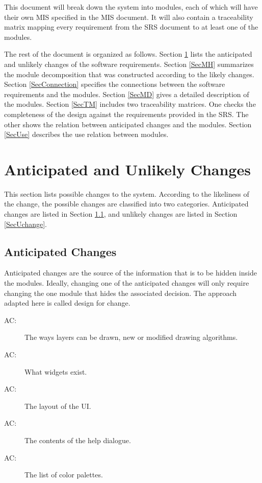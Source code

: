 \documentclass[12pt, titlepage]{article}
\newcounter{acnum}
\newcommand{\actheacnum}{AC\theacnum}
\begin{document}
This document will break down the system into modules, each of which will have their own MIS specified in the MIS document. It will also contain a traceability matrix mapping every requirement from the SRS document to at least one of the modules.

The rest of the document is organized as follows. Section
\ref{SecChange} lists the anticipated and unlikely changes of the software
requirements. Section \ref{SecMH} summarizes the module decomposition that
was constructed according to the likely changes. Section \ref{SecConnection}
specifies the connections between the software requirements and the
modules. Section \ref{SecMD} gives a detailed description of the
modules. Section \ref{SecTM} includes two traceability matrices. One checks
the completeness of the design against the requirements provided in the SRS. The
other shows the relation between anticipated changes and the modules. Section
\ref{SecUse} describes the use relation between modules.

\section{Anticipated and Unlikely Changes} \label{SecChange}

This section lists possible changes to the system. According to the likeliness
of the change, the possible changes are classified into two
categories. Anticipated changes are listed in Section \ref{SecAchange}, and
unlikely changes are listed in Section \ref{SecUchange}.

\subsection{Anticipated Changes} \label{SecAchange}

Anticipated changes are the source of the information that is to be hidden
inside the modules. Ideally, changing one of the anticipated changes will only
require changing the one module that hides the associated decision. The approach
adapted here is called design for
change.

\begin{description}
\item[ \actheacnum \label{acLayerDraw}:] The ways layers can be drawn, new or modified drawing algorithms.
\item[ \actheacnum \label{acWidget}:] What widgets exist.
\item[ \actheacnum \label{acUILayout}:] The layout of the UI.
\item[ \actheacnum \label{acHelp}:] The contents of the help dialogue.
\item[ \actheacnum \label{acPalettes}:] The list of color palettes.
\end{description}
\end{document}

